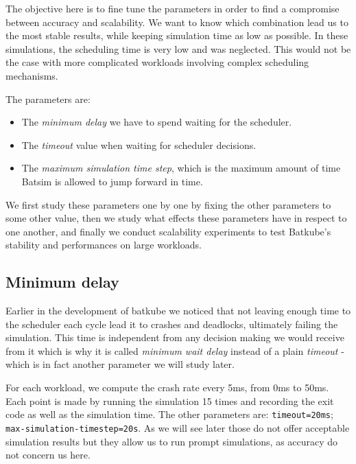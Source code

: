 The objective here is to fine tune the parameters in order to find a compromise
between accuracy and scalability. We want to know which combination lead us to
the most stable results, while keeping simulation time as low as possible. In
these simulations, the scheduling time is very low and was neglected.  This
would not be the case with more complicated workloads involving complex
scheduling mechanisms.

The parameters are:
\begin{itemize}
	\item The \textit{minimum delay} we have to spend waiting for the
		scheduler.
	\item The \textit{timeout} value when waiting for scheduler decisions.
	\item The \textit{maximum simulation time step}, which is the maximum
		amount of time Batsim is allowed to jump forward in time.
\end{itemize}

We first study these parameters one by one by fixing the other parameters to
some other value, then we study what effects these parameters have in respect
to one another, and finally we conduct scalability experiments to test
Batkube's stability and performances on large workloads.

\subsection{Minimum delay}

Earlier in the development of batkube we noticed that not leaving enough time
to the scheduler each cycle lead it to crashes and deadlocks, ultimately
failing the simulation. This time is independent from any decision making we
would receive from it which is why it is called \textit{minimum wait delay}
instead of a plain \textit{timeout} - which is in fact another parameter we
will study later.

For each workload, we compute the crash rate every 5ms, from 0ms to 50ms. Each
point is made by running the simulation 15 times and recording the exit code as
well as the simulation time. The other parameters are: \texttt{timeout=20ms};
\texttt{max-simulation-timestep=20s}. As we will see later those do not offer
acceptable simulation results but they allow us to run prompt simulations, as
accuracy do not concern us here.\\

